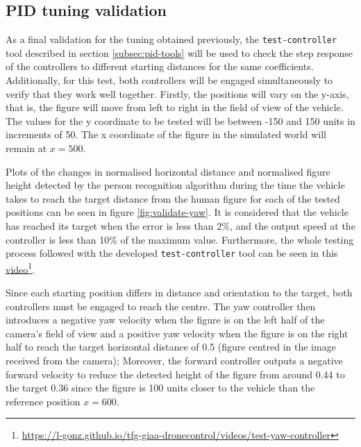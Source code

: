 \subsection{PID tuning validation}
\label{subsec:pid-test-controller}

As a final validation for the tuning obtained previously, the \texttt{test-controller} tool described in section \ref{subsec:pid-tools} will be used to check the step response of the controllers to different starting distances for the same coefficients.
Additionally, for this test, both controllers will be engaged simultaneously to verify that they work well together.
Firstly, the positions will vary on the y-axis, that is, the figure will move from left to right in the field of view of the vehicle.
The values for the y coordinate to be tested will be between -150 and 150 units in increments of 50.
The x coordinate of the figure in the simulated world will remain at $x=500$.

Plots of the changes in normalised horizontal distance and normalised figure height detected by the person recognition algorithm during the time the vehicle takes to reach the target distance from the human figure for each of the tested positions can be seen in figure \ref{fig:validate-yaw}.
It is considered that the vehicle has reached its target when the error is less than 2\%, and the output speed at the controller is less than 10\% of the maximum value.
Furthermore, the whole testing process followed with the developed \texttt{test-controller} tool can be seen in this \href{https://l-gonz.github.io/tfg-giaa-dronecontrol/videos/test-yaw-controller}{video}\footnote{\url{https://l-gonz.github.io/tfg-giaa-dronecontrol/videos/test-yaw-controller}}.

Since each starting position differs in distance and orientation to the target, both controllers must be engaged to reach the centre.
The yaw controller then introduces a negative yaw velocity when the figure is on the left half of the camera's field of view and a positive yaw velocity when the figure is on the right half to reach the target horizontal distance of 0.5 (figure centred in the image received from the camera);
Moreover, the forward controller outputs a negative forward velocity to reduce the detected height of the figure from around 0.44 to the target 0.36 since the figure is 100 units closer to the vehicle than the reference position $x=600$.

